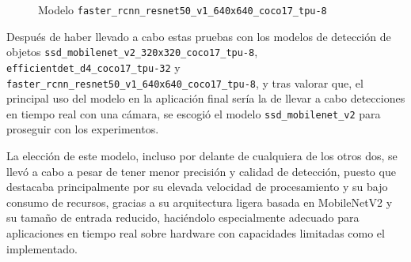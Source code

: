   	\begin{figure}[H]
    		\begin{center}
      		\subcapcentertrue
      		\hspace{2mm}
    	\end{center}
    	\caption{Modelo \texttt{faster\_rcnn\_resnet50\_v1\_640x640\_coco17\_tpu-8 }}
    	\label{fig:modelo_faster_rcnn_resnet50}
  	\end{figure}	

Después de haber llevado a cabo estas pruebas con los modelos de detección de objetos \verb|ssd_mobilenet_v2_320x320_coco17_tpu-8|, \verb|efficientdet_d4_coco17_tpu-32| y \verb|faster_rcnn_resnet50_v1_640x640_coco17_tpu-8|, y tras valorar que, el principal uso del modelo en la aplicación final sería la de llevar a cabo detecciones en tiempo real con una cámara, se escogió el modelo \verb|ssd_mobilenet_v2| para proseguir con los experimentos. 

La elección de este modelo, incluso por delante de cualquiera de los otros dos, se llevó a cabo a pesar de tener menor precisión y calidad de detección, puesto que destacaba principalmente por su elevada velocidad de procesamiento y su bajo consumo de recursos, gracias a su arquitectura ligera basada en MobileNetV2 y su tamaño de entrada reducido, haciéndolo especialmente adecuado para aplicaciones en tiempo real sobre hardware con capacidades limitadas como el implementado.

